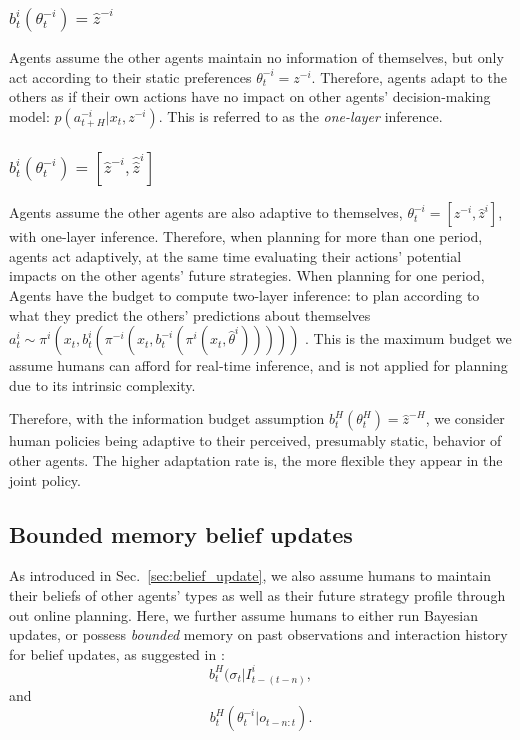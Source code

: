 \documentclass[letterpaper, 10 pt, conference]{ieeeconf}  %
\begin{document}
\subsubsection{$b^i_t(\theta^{-i}_t) = \hat{z}^{-i}$}
Agents assume the other agents maintain no information of themselves, but only 
act according to their static preferences $\theta^{-i}_t = z^{-i}$. Therefore, 
agents adapt to the others as if their own actions have no impact on other 
agents' decision-making model: $p(a^{-i}_{t+H}|x_t, z^{-i})$. This is referred 
to as the \textit{one-layer} inference.

\subsubsection{$b^i_t(\theta^{-i}_t) = 
[\hat{z}^{-i}, 
\hat{\hat{z}}^i]$}
Agents assume the other agents are also adaptive to themselves,
$\theta^{-i}_t = [z^{-i},
\hat{z}^{i}]$, with one-layer inference. 
Therefore, when planning for more than one period, agents act adaptively, at 
the same time evaluating their actions' potential impacts on the other agents' future 
strategies. When planning for one period, Agents have the budget to compute 
two-layer inference: to plan according to what they predict the others' 
predictions about themselves 
$a^i_t \sim \pi^i(x_t, b^i_t(\pi^{-i}(x_t,b^{-i}_t(\pi^i(x_t,\hat{\theta}^i)))))$
. This is the maximum budget we assume humans can afford for real-time 
inference, and is not applied for planning due to its 
intrinsic complexity. 

Therefore, with the information budget assumption $b^H_t(\theta^H_t) = \hat{z}^{-H}$, we consider human policies 
being adaptive to their perceived, presumably static, behavior of other 
agents. The higher adaptation rate is, the more flexible they 
appear in the joint policy. 


\subsection{Bounded memory belief updates}
As introduced in Sec.~\ref{sec:belief_update}, we also assume humans to maintain their 
beliefs of other agents' types as well as their future strategy profile 
through out online planning. 
Here, we further assume humans to either run Bayesian updates, or possess \textit{bounded} memory on past observations and 
interaction history for belief updates, as suggested in \cite{nikolaidis2016formalizing}: 
$$
b^H_t(\sigma_{t}|I^i_{t-(t-n)},
$$
and
$$
b^H_t(\theta^{-i}_t|o_{t-n:t}).
$$
\end{document}
